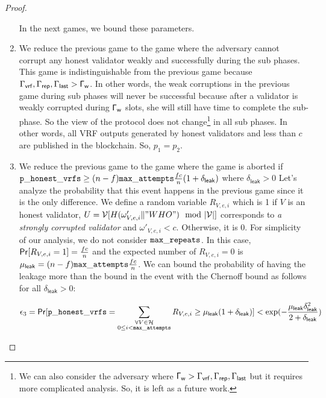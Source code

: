 \begin{proof}
\begin{enumerate}[label={{Game }}{{\arabic*}}]
	 In the next games, we bound these parameters.
	
	\item We reduce the previous game to the game where the adversary cannot corrupt  any honest validator weakly and successfully during the sub phases. This game is indistinguishable from the previous game  because $ \Gamma_{\mathsf{vrf}}, \Gamma_{\mathsf{rep}}, \Gamma_{\mathsf{last}}> \mathsf{\Gamma_{w}} $. In other words, the weak corruptions in the previous game during sub phases will never be successful because after a validator is weakly corrupted during $\mathsf{\Gamma_{w}} $ slots, she will still have time to complete the sub-phase. So the view of the protocol does not change\footnote{We can also consider the adversary where $ \mathsf{\Gamma_{w}} > \Gamma_{\mathsf{vrf}}, \Gamma_{\mathsf{rep}}, \Gamma_{\mathsf{last}} $ but it requires more complicated analysis. So, it is left as a future work.} in all sub phases. In other words, all VRF outputs generated by honest validators and less than $ c $ are published in the blockchain. So, $ p_1 = p_2 $.
	
	\item We reduce the previous game to the game where the game is aborted if $ \mathtt{p\_honest\_vrfs} \geq  (n-f)\mathtt{max\_attempts} \frac{fc}{n} (1+\delta_{\mathsf{leak}})  $ where  $ \delta_{\mathsf{leak}} > 0 $  Let's analyze the probability that this event happens in the previous game since it is the only difference. We define a random variable $ R_{V,e,i} $ which is 1 if $ V $ is an honest validator, $ U = \mathcal{V}[H(\omega'_{V,e,i} \| "WHO") \mod |\mathcal{V}|]  $ corresponds to \emph{a strongly corrupted validator} and  $ \omega'_{V,e,i} < c $. Otherwise, it is 0. For simplicity of our analysis, we do not consider $ \mathtt{max\_repeats} $. In this case, $ \mathsf{Pr}[R_{V,e,i} = 1] = \frac{fc}{n}$ 
	and
	the expected number of $ R_{V,e,i}  = 0$ is  $ \mu_{\mathsf{leak}} = (n-f) \mathtt{max\_attempts} \frac{fc}{n} $. We can bound the probability of having the leakage more than the bound in the event with the Chernoff bound as follows for all $ \delta_{\mathsf{leak}} > 0 	 $:
	
	\begin{equation}\label{eq:beforeepcoh}
	\epsilon_3 = \mathsf{Pr}[ \mathtt{p\_honest\_vrfs} = \sum_{\substack{ \forall V \in \mathcal{H} \\0\leq i < \mathtt{max\_attempts}}} R_{V,e,i} \geq \mu_{\mathsf{leak}} (1+ \delta_{\mathsf{leak}})] < \exp(-\frac{\mu_{\mathsf{leak}}\delta_{\mathsf{leak}}^2}{2+\delta_{\mathsf{leak}}}) \nonumber
	\end{equation}
	

\end{enumerate}
\end{proof}
